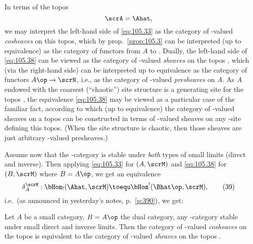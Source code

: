 In terms of the topos
\[\scrA=\Ahat,\]
we may interpret the left-hand side of \eqref{eq:105.33} as the
category of \scrM-valued \emph{cosheaves} on this topos, which by
prop.\ \ref{prop:105.3} can be interpreted (up to equivalence) as the
category of functors from $A$ to \scrM. Dually, the left-hand side of
\eqref{eq:105.38} can be viewed as the category of \scrN-valued
\emph{sheaves} on the topos \scrA, which (via the right-hand side) can
be interpreted up to equivalence as the category of functors
$A\op\to\scrN$, i.e., as the category of \scrN-valued
\emph{presheaves} on $A$. As $A$ endowed with the coarsest
(``chaotic'') site structure is a generating site for the topos \scrA,
the equivalence \eqref{eq:105.38} may be viewed as a particular case
of the familiar fact, according to which (up to equivalence) the
category of \scrN-valued sheaves on a topos can be constructed in
terms of \scrN-valued sheaves on any \scrU-site defining this
topos. (When the site structure is chaotic, then those sheaves are
just arbitrary \scrN-valued presheaves.)

Assume now that the \scrU-category \scrM{} is stable under \emph{both}
types of small limits (direct and inverse). Then applying
\eqref{eq:105.33} for $(A,\scrM)$ and \eqref{eq:105.38} for
$(B,\scrM)$ where $B=A\op$, we get an equivalence
\begin{equation}
  \label{eq:105.39}
  \delta_A^\scrM:\bHom_!(\Ahat,\scrM) \toequ\bHom^!(\Bhat\op,\scrM),\tag{39}
\end{equation}
i.e.\ (as announced in yesterday's notes, p.\ \ref{p:390}), we get:
\begin{corollarynum}\label{cor:105.prop3.2}
  Let $A$ be a small category, $B=A\op$ the dual category, \scrM{} any
  \scrU-category stable under small direct and inverse limits. Then
  the category of \scrM-valued \emph{cosheaves} on the topos \Ahat{}
  is equivalent to the category of \scrM-valued
  \emph{sheaves} on the topos \Bhat.
\end{corollarynum}


